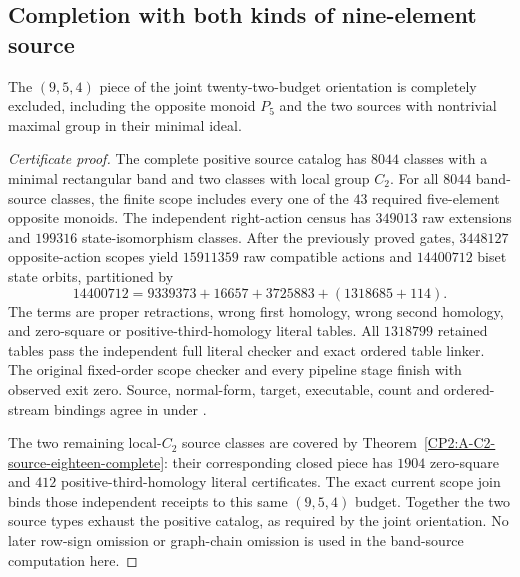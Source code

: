 \subsection{Completion with both kinds of nine-element source}

\begin{proposition}
\label{CP2:A-oriented-eighteen-nine-five-four}
The $(9,5,4)$ piece of the joint twenty-two-budget orientation is
completely excluded, including the opposite monoid $P_5$ and the two
sources with nontrivial maximal group in their minimal ideal.
\end{proposition}
\begin{proof}[Certificate proof]
The complete positive source catalog has $8044$ classes with a minimal
rectangular band and two classes with local group $C_2$.
For all $8044$ band-source classes, the finite scope includes every one
of the $43$ required five-element opposite monoids.  The independent
right-action census has $349013$ raw extensions and $199316$
state-isomorphism classes.  After the previously proved gates,
$3448127$ opposite-action scopes yield $15911359$ raw compatible
actions and $14400712$ biset state orbits, partitioned by
\[
 14400712=9339373+16657+3725883+(1318685+114).
\]
The terms are proper retractions, wrong first homology, wrong second
homology, and zero-square or positive-third-homology literal tables.
All $1318799$ retained tables pass the independent full literal checker
and exact ordered table linker.  The original fixed-order scope checker
and every pipeline stage finish with observed exit zero.  Source,
normal-form, target, executable, count and ordered-stream bindings agree
in  under
.

The two remaining local-$C_2$ source classes are covered by
Theorem~\ref{CP2:A-C2-source-eighteen-complete}: their corresponding
closed piece has $1904$ zero-square and $412$
positive-third-homology literal certificates.  The exact current scope
join binds those independent receipts to this same $(9,5,4)$ budget.
Together the two source types exhaust the positive catalog, as required
by the joint orientation.  No later row-sign omission or graph-chain
omission is used in the band-source computation here.
\end{proof}
